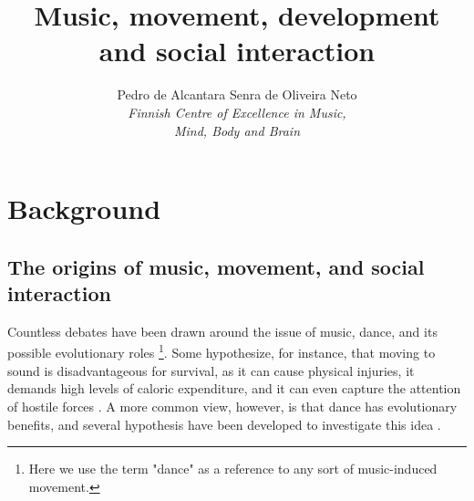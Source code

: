 \documentclass[16pt]{article}
\title{\textbf{Music, movement, development and social interaction}}
\author{Pedro de Alcantara Senra de Oliveira Neto\\ \textit{Finnish Centre of Excellence in Music,} \\ \textit{Mind, Body and Brain} }
\begin{document}
\maketitle




\section{Background}

\subsection{The origins of music, movement, and social interaction}

Countless debates have been drawn around the issue of music, dance, and its possible evolutionary roles \cite<for a recent discussion, see>{savage2021music, mehr2021origins}\footnote{Here we use the term "dance" as a reference to any sort of music-induced movement.}. Some hypothesize, for instance, that moving to sound is disadvantageous for survival, as it can cause physical injuries, it demands high levels of caloric expenditure, and it can even capture the attention of hostile forces \cite{christensen2017not}. A more common view, however, is that dance has evolutionary benefits, and several hypothesis have been developed to investigate this idea \cite{christensen2016affective, phillips2009meaning, savage2021music}.
\end{document}
